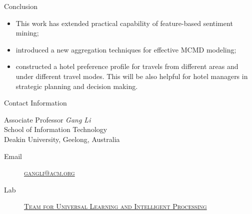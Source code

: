 \documentclass[
 size=12pt,
 paper=smartboard,  %
 mode=present, 		%
 display=slides, 	%
 style=tuliplab,  	%
 pauseslide,
 fleqn,leqno]{powerdot}
\begin{document}
\begin{slide}[toc=,bm=]{Conclusion}
\begin{itemize}
\item This work has extended practical capability of feature-based sentiment mining; \pause

\item introduced a new aggregation techniques for effective MCMD modeling; \pause
 
\item constructed a hotel preference profile for travels from different areas and under different travel modes.
This will be also helpful for hotel managers in strategic planning and decision making.
\end{itemize}
\pause
\begin{center}
\textcolor{red}{\scalebox{1.5}{Questions?}}
\end{center}
\end{slide}


\begin{wideslide}[toc=,bm=]{Contact Information}
\centering
{}
\twocolumn[
lcolwidth=0.35\linewidth,
rcolwidth=0.65\linewidth
]
{
}
{
Associate Professor \emph{Gang Li}\\
School of Information Technology\\
Deakin University, Geelong, Australia
\begin{description}
 \item[Email] \href{mailto:gangli@acm.org}
 {\textsc{\footnotesize{gangli@acm.org}}}
 
 \item[Lab] \href{http://www.tulip.org.au}
 {\textsc{\footnotesize{Team for Universal Learning and Intelligent Processing}}} 
\end{description}
} 
\end{wideslide}
\end{document}
